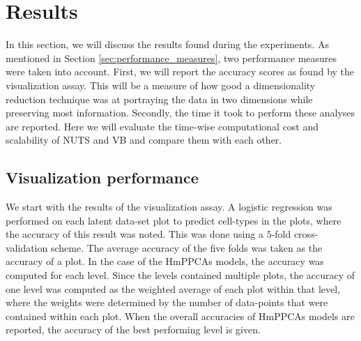 \chapter{Results}\label{sec:results}

In this section, we will discuss the results found during the experiments. As mentioned in Section \ref{sec:performance_measures}, two performance measures were taken into account. First, we will report the accuracy scores as found by the visualization assay. This will be a measure of how good a dimensionality reduction technique was at portraying the data in two dimensions while preserving most information. Secondly, the time it took to perform these analyses are reported. Here we will evaluate the time-wise computational cost and scalability of NUTS and VB and compare them with each other.

\section{Visualization performance}
We start with the results of the visualization assay. A logistic regression was performed on each latent data-set plot to predict cell-types in the plots, where the accuracy of this result was noted. This was done using a $5$-fold cross-validation scheme. The average accuracy of the five folds was taken as the accuracy of a plot. In the case of the HmPPCAs models, the accuracy was computed for each level. Since the levels contained multiple plots, the accuracy of one level was computed as the weighted average of each plot within that level, where the weights were determined by the number of data-points that were contained within each plot. When the overall accuracies of HmPPCAs models are reported, the accuracy of the best performing level is given.



